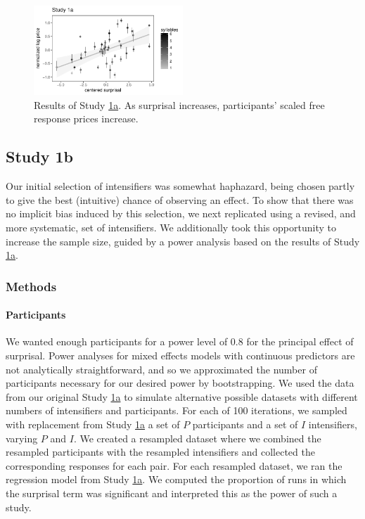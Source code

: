 \begin{figure}[ht]
\begin{center}
\includegraphics[width=0.5\textwidth]{images/plot_study1a.pdf}
\end{center}
\caption{Results of Study \hyperref[sec:study1a]{1a}. As surprisal increases, participants' scaled free response prices increase.} 
\label{fig:plot_study1a}
\end{figure}

\subsection{Study 1b \label{sec:study1b}}

Our initial selection of intensifiers was somewhat haphazard, being chosen partly to give the best (intuitive) chance of observing an effect. 
To show that there was no implicit bias induced by this selection, we next replicated using a revised, and more systematic, set of intensifiers.
We additionally took this opportunity to increase the sample size, guided by a power analysis based on the results of Study \hyperref[sec:study1a]{1a}.

\subsubsection{Methods}

\paragraph{Participants}

We wanted enough participants for a power level of 0.8 for the principal effect of surprisal.
Power analyses for mixed effects models with continuous predictors are not analytically straightforward, and so we approximated the number of participants necessary for our desired power by bootstrapping.
We used the data from our original Study \hyperref[sec:study1a]{1a} to simulate alternative possible datasets with different numbers of intensifiers and participants.
For each of 100 iterations, we sampled with replacement from Study \hyperref[sec:study1a]{1a} a set of $P$ participants and a set of $I$ intensifiers, varying $P$ and $I$.
We created a resampled dataset where we combined the resampled participants with the resampled intensifiers and collected the corresponding responses for each pair.
For each resampled dataset, we ran the regression model from Study \hyperref[sec:study1a]{1a}.
We computed the proportion of runs in which the surprisal term was significant and interpreted this as the power of such a study.

